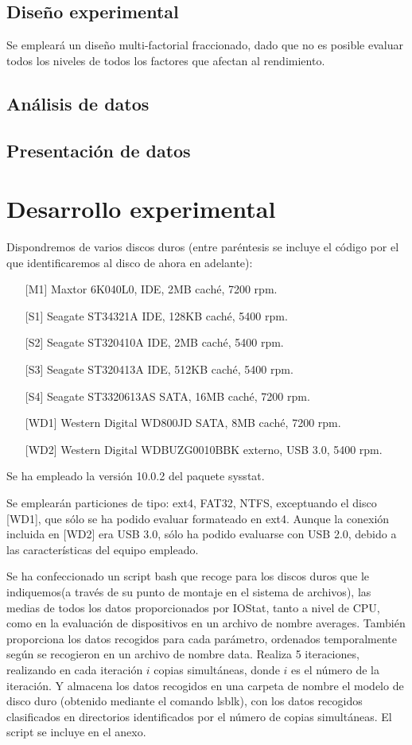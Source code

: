 \documentclass[a4paper,10pt]{article}
\renewcommand{\texttt}[2][black!60]{\textcolor{#1}{\ttfamily #2}}
\begin{document}
 \subsection{Diseño experimental}
 Se empleará un diseño multi-factorial fraccionado, dado que no es posible evaluar todos los niveles de todos los factores
 que afectan al rendimiento. 
 
 \subsection{Análisis de datos}
 
 \subsection{Presentación de datos}
 
 
 \section{Desarrollo experimental}
Dispondremos de varios discos duros (entre paréntesis se incluye el código por el que identificaremos al disco
de ahora en adelante): \label{discos}
\begin{itemize}
 \item [][M1] Maxtor 6K040L0, IDE, 2MB caché, 7200 rpm.
 \item [][S1] Seagate ST34321A IDE, 128KB caché, 5400 rpm.
 \item [][S2] Seagate ST320410A IDE, 2MB caché, 5400 rpm. 
 \item [][S3] Seagate ST320413A IDE, 512KB caché, 5400 rpm.
 \item [][S4] Seagate ST3320613AS SATA, 16MB caché, 7200 rpm. 
 \item [][WD1] Western Digital WD800JD SATA, 8MB caché, 7200 rpm.
 \item [][WD2] Western Digital WDBUZG0010BBK externo, USB 3.0, 5400 rpm.
\end{itemize}

Se ha empleado la versión 10.0.2 del paquete \texttt{sysstat}.

Se emplearán particiones de tipo: ext4, FAT32, NTFS, exceptuando el disco [WD1], que sólo se ha podido evaluar
formateado en ext4. Aunque la conexión incluida en [WD2] era USB 3.0, sólo ha podido evaluarse con USB 2.0, debido
a las características del equipo empleado.

Se ha confeccionado un script \texttt{bash} que recoge para los discos duros que le indiquemos(a través de su punto de montaje
en el sistema de archivos), las medias de todos los datos proporcionados por IOStat, tanto a nivel de CPU, como
en la evaluación de dispositivos en un archivo de nombre \texttt{averages}. También proporciona los datos recogidos
para cada parámetro, ordenados temporalmente según se recogieron en un archivo de nombre \texttt{data}. Realiza 
5 iteraciones, realizando en cada iteración $i$ copias simultáneas, donde $i$ es el número de la iteración. Y almacena
los datos recogidos en una carpeta de nombre el modelo de disco duro (obtenido mediante el comando \texttt{lsblk}), con
los datos recogidos clasificados en directorios identificados por el número de copias simultáneas. El script se incluye en el
anexo.
\end{document}
